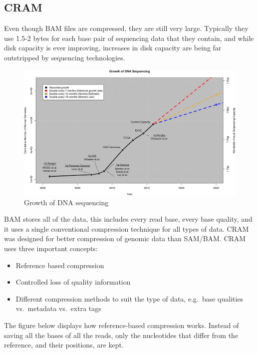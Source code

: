 \documentclass[11pt]{article}
\providecommand{\tightlist}{%
      \setlength{\itemsep}{0pt}\setlength{\parskip}{0pt}}
\begin{document}
    \hypertarget{cram}{%
\subsection{CRAM}\label{cram}}

Even though BAM files are compressed, they are still very large.
Typically they use 1.5-2 bytes for each base pair of sequencing data
that they contain, and while disk capacity is ever improving, increases
in disk capacity are being far outstripped by sequencing technologies.

    \begin{figure}[!h]
\centering
\includegraphics{img/compression_cram.png}
\caption{Growth of DNA sequencing}
\end{figure}

    BAM stores all of the data, this includes every read base, every base
quality, and it uses a single conventional compression technique for all
types of data. CRAM was designed for better compression of genomic data
than SAM/BAM. CRAM uses three important concepts:

\begin{itemize}
\tightlist
\item
  Reference based compression
\item
  Controlled loss of quality information
\item
  Different compression methods to suit the type of data, e.g.~base
  qualities vs.~metadata vs.~extra tags
\end{itemize}

The figure below displays how reference-based compression works. Instead
of saving all the bases of all the reads, only the nucleotides that
differ from the reference, and their positions, are kept.
\end{document}
